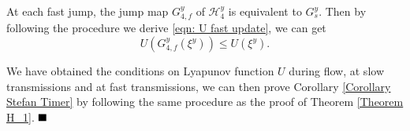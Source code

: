At each fast jump, the jump map $G_{4,f}^y$ of $\mathcal{H}_4^y$ is equivalent to $G_s^y$. Then by following the procedure we derive \eqref{eqn: U fast update}, we can get
\begin{equation}
    U(G_{4,f}^y(\xi^y)) \leq U(\xi^y).
\end{equation}

We have obtained the conditions on Lyapunov function $U$ during flow, at slow transmissions and at fast transmissions, we can then prove Corollary \ref{Corollary Stefan Timer} by following the same procedure as the proof of Theorem \ref{Theorem H_1}. $\hfill\blacksquare$